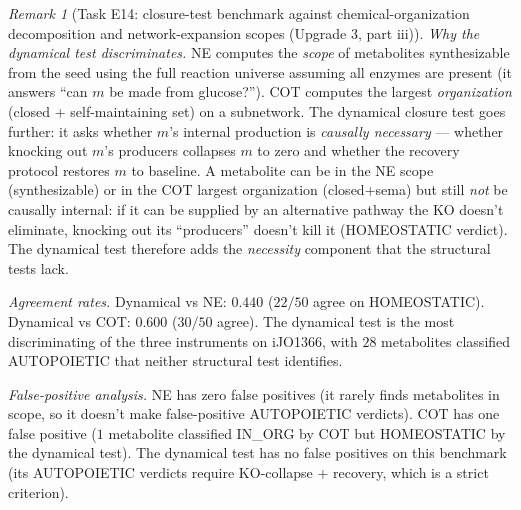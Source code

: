 \documentclass[11pt,a4paper]{article}
\theoremstyle{plain}
\theoremstyle{definition}
\theoremstyle{remark}
\newtheorem{remark}[theorem]{Remark}
\begin{document}
\begin{remark}[Task E14: closure-test benchmark against
chemical-organization decomposition and network-expansion scopes
(Upgrade 3, part iii)]
\medskip
\emph{Why the dynamical test discriminates.} NE computes the
\emph{scope} of metabolites synthesizable from the seed using the
full reaction universe assuming all enzymes are present (it answers
``can $m$ be made from glucose?''). COT computes the largest
\emph{organization} (closed + self-maintaining set) on a
subnetwork. The dynamical closure test goes further: it asks
whether $m$'s internal production is \emph{causally necessary} ---
whether knocking out $m$'s producers collapses $m$ to zero and
whether the recovery protocol restores $m$ to baseline. A metabolite
can be in the NE scope (synthesizable) or in the COT largest
organization (closed+sema) but still \emph{not} be causally
internal: if it can be supplied by an alternative pathway the KO
doesn't eliminate, knocking out its ``producers'' doesn't kill it
(HOMEOSTATIC verdict). The dynamical test therefore adds the
\emph{necessity} component that the structural tests lack.

\medskip
\emph{Agreement rates.} Dynamical vs NE: $0.440$ ($22/50$ agree on
HOMEOSTATIC). Dynamical vs COT: $0.600$ ($30/50$ agree). The
dynamical test is the most discriminating of the three instruments
on iJO1366, with $28$ metabolites classified AUTOPOIETIC that
neither structural test identifies.

\medskip
\emph{False-positive analysis.} NE has zero false positives (it
rarely finds metabolites in scope, so it doesn't make
false-positive AUTOPOIETIC verdicts). COT has one false positive
($1$ metabolite classified IN\_ORG by COT but HOMEOSTATIC by the
dynamical test). The dynamical test has no false positives on this
benchmark (its AUTOPOIETIC verdicts require KO-collapse + recovery,
which is a strict criterion).
\end{remark}
\end{document}
